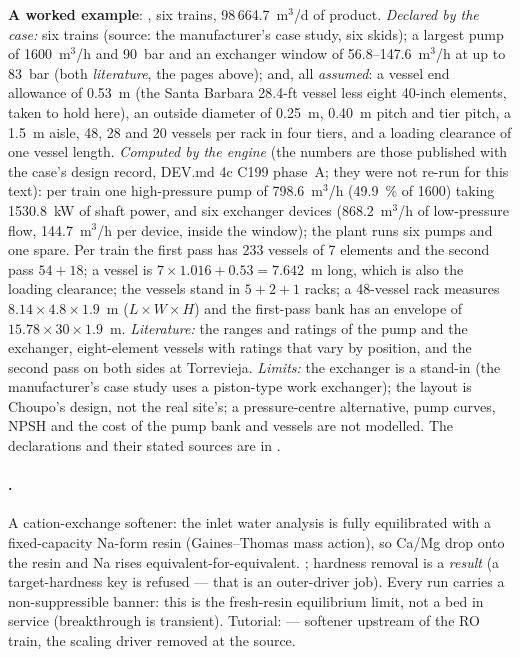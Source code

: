 \documentclass[11pt,a4paper]{article}
\begin{document}
\noindent\textbf{A worked example}: , six trains,
98\,664.7~m$^3$/d of product.  \emph{Declared by the case:} six trains
(source: the manufacturer's case study, six skids); a largest pump of
1600~m$^3$/h and 90~bar and an exchanger window of 56.8--147.6~m$^3$/h at up
to 83~bar (both \emph{literature}, the pages above); and, all
\emph{assumed}: a vessel end allowance of 0.53~m (the Santa Barbara
28.4-ft vessel less eight 40-inch elements, taken to hold here), an outside
diameter of 0.25~m, 0.40~m pitch and tier pitch, a 1.5~m aisle, 48, 28 and
20 vessels per rack in four tiers, and a loading clearance of one vessel
length.  \emph{Computed by the engine} (the numbers are those published with
the case's design record, DEV.md 4c C199 phase~A; they were not re-run for
this text): per train one high-pressure pump of 798.6~m$^3$/h (49.9~\% of
1600) taking 1530.8~kW of shaft power, and six exchanger devices
(868.2~m$^3$/h of low-pressure flow, 144.7~m$^3$/h per device, inside the
window); the plant runs six pumps and one spare.  Per train the first pass has
233 vessels of 7 elements and the second pass $54+18$; a vessel is
$7\times1.016+0.53=7.642$~m long, which is also the loading clearance; the
vessels stand in $5+2+1$ racks; a 48-vessel rack measures
$8.14\times4.8\times1.9$~m ($L\times W\times H$) and the first-pass bank has
an envelope of $15.78\times30\times1.9$~m.  \emph{Literature:} the ranges and
ratings of the pump and the exchanger, eight-element vessels with ratings that
vary by position, and the second pass on both sides at Torrevieja.
\emph{Limits:} the exchanger is a stand-in (the manufacturer's case study
uses a piston-type work exchanger); the layout is Choupo's design, not the
real site's; a pressure-centre alternative, pump curves, NPSH and the cost of
the pump bank and vessels are not modelled.  The declarations and their
stated sources are in
.


\paragraph{.}  A cation-exchange softener: the inlet
water analysis is fully equilibrated with a fixed-capacity Na-form
resin (Gaines--Thomas mass action), so Ca/Mg drop onto the resin and Na
rises equivalent-for-equivalent.  ; hardness removal is a \emph{result} (a
target-hardness key is refused --- that is an outer-driver job).  Every
run carries a non-suppressible banner: this is the fresh-resin
equilibrium limit, not a bed in service (breakthrough is transient).
Tutorial:  --- softener upstream of
the RO train, the scaling driver removed at the source.
\end{document}
